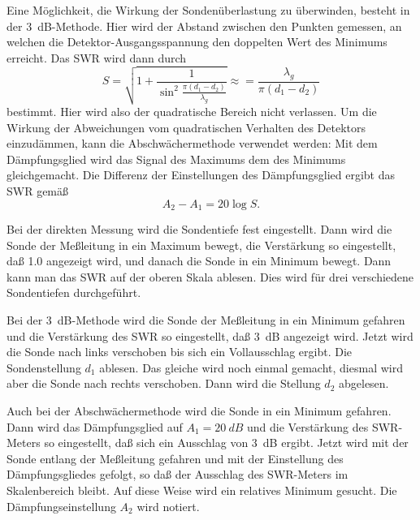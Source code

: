 Eine Möglichkeit, die Wirkung der Sondenüberlastung zu überwinden,
besteht in der \SI{3}{dB}-Methode.  Hier wird der Abstand zwischen den
Punkten gemessen, an welchen die Detektor-Ausgangsspannung den doppelten
Wert des Minimums erreicht.  Das SWR wird dann durch
%
\begin{equation}
  S = \sqrt{ 1 + \frac{1}{\sin^2 \frac{\pi(d_1-d_2)}{\lambda_g}}}
  \approx = \frac{\lambda_g}{\pi(d_1-d_2)}
\end{equation}
bestimmt. Hier wird also der quadratische Bereich nicht verlassen.  Um
die Wirkung der Abweichungen vom quadratischen Verhalten des Detektors
einzudämmen, kann die Abschwächermethode verwendet werden: Mit dem
Dämpfungsglied wird das Signal des Maximums dem des Minimums
gleichgemacht.  Die Differenz der Einstellungen des Dämpfungsglied
ergibt das SWR gemäß
%
\begin{equation}
  A_2 - A_1 = 20 \log S.
\end{equation}

Bei der direkten Messung wird die Sondentiefe fest eingestellt.  Dann
wird die Sonde der Meßleitung in ein Maximum bewegt, die Verstärkung so
eingestellt, daß \num{1.0} angezeigt wird, und danach die Sonde in ein
Minimum bewegt.  Dann kann man das SWR auf der oberen Skala
ablesen. Dies wird für drei verschiedene Sondentiefen durchgeführt.

Bei der \SI{3}{dB}-Methode wird die Sonde der Meßleitung in ein Minimum
gefahren und die Verstärkung des SWR so eingestellt, daß \SI{3}{dB}
angezeigt wird.  Jetzt wird die Sonde nach links verschoben bis sich ein
Vollausschlag ergibt.  Die Sondenstellung $d_1$ ablesen.  Das gleiche
wird noch einmal gemacht, diesmal wird aber die Sonde nach rechts
verschoben.  Dann wird die Stellung $d_2$ abgelesen.

Auch bei der Abschwächermethode wird die Sonde in ein Minimum gefahren.
Dann wird das Dämpfungsglied auf $A_1 = \SI{20}{dB}$ und die Verstärkung
des SWR-Meters so eingestellt, daß sich ein Ausschlag von \SI{3}{dB}
ergibt.  Jetzt wird mit der Sonde entlang der Meßleitung gefahren und
mit der Einstellung des Dämpfungsgliedes gefolgt, so daß der Ausschlag
des SWR-Meters im Skalenbereich bleibt.  Auf diese Weise wird ein relatives
Minimum gesucht.  Die Dämpfungseinstellung $A_2$ wird notiert.
